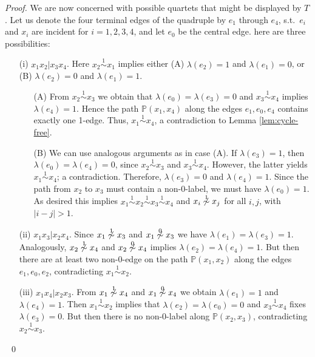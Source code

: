 \documentclass[smallextended]{svjour3}
\newcommand{\Ro}{\mathrel{\overset{0}{\sim}}}
\newcommand{\Rl}{\mathrel{\overset{1}{\sim}}}
\begin{document}
{\begin{proof}
  We are now concerned with possible quartets that might be displayed by
  $T$.  Let us denote the four terminal edges of the quadruple by $e_1$
  through $e_4$, s.t.\ $e_i$ and $x_i$ are incident for $i=1,2,3,4$, and
  let $e_0$ be the central edge. here are three possibilities:
\begin{itemize}
\item[(i)] $x_1x_2|x_3x_4$. Here $x_2\Rl x_1$ implies either (A)
  $\lambda(e_2)=1$ and $\lambda(e_1)=0$, or (B) $\lambda(e_2)=0$ and
  $\lambda(e_1)=1$.
  \begin{enumerate}
  \item[(A)] From $x_2\Rl x_3$ we obtain that $\lambda(e_0)=\lambda(e_3)=0$
    and $x_3\Rl x_4$ implies $\lambda(e_4)=1$. Hence the path
    $\mathbb{P}(x_1,x_4)$ along the edges $e_1,e_0,e_4$ contains exactly
    one 1-edge.  Thus, $x_1\Rl x_4$, a contradiction to Lemma
    \ref{lem:cycle-free}.
  \item[(B)] We can use analogous arguments as in case (A).  If
    $\lambda(e_3)=1$, then $\lambda(e_0)=\lambda(e_4)=0$, since $x_2\Rl
    x_3$ and $x_3\Rl x_4$.  However, the latter yields $x_1\Rl x_4$; a
    contradiction. Therefore, $\lambda(e_3)=0$ and $\lambda(e_4)=1$. Since
    the path from $x_2$ to $x_3$ must contain a non-0-label, we must have
    $\lambda(e_0)=1$. As desired this implies $x_1\Rl x_2 \Rl x_3 \Rl x_4$
    and $x_i\not \Rl x_j$ for all $i,j$, with $|i-j|>1$.
  \end{enumerate}
\item[(ii)] $x_1x_3|x_2x_4$. Since $x_1\not\Rl x_3$ and $x_1\not\Ro x_3$ we
  have $\lambda(e_1)=\lambda(e_3)=1$. Analogously, $x_2\not\Rl x_4$ and
  $x_2\not\Ro x_4$ implies $\lambda(e_2)=\lambda(e_4)=1$. But then there
  are at least two non-0-edge on the path $\mathbb{P}(x_1,x_2)$ along the
  edges $e_1,e_0,e_2$, contradicting $x_1\Rl x_2$.
\item[(iii)] $x_1x_4|x_2x_3$. From $x_1\not\Rl x_4$ and $x_1\not\Ro x_4$ we
  obtain $\lambda(e_1)=1$ and $\lambda(e_4)=1$. Then $x_1\Rl x_2$ implies
  that $\lambda(e_2)=\lambda(e_0)=0$ and $x_3\Rl x_4$ fixes
  $\lambda(e_3)=0$.  But then there is no non-0-label along
  $\mathbb{P}(x_2,x_3)$, contradicting $x_2\Rl x_3$.
\end{itemize} 
\ \qed
\end{proof}

}
\end{document}

